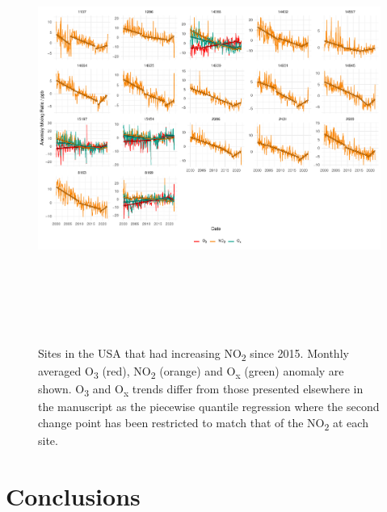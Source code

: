 \documentclass[journal abbreviation, manuscript]{copernicus}
\begin{document}
\begin{figure}
    \includegraphics[height=14cm]{figures/f14_no2_in_usa.pdf}
\caption{Sites in the USA that had increasing NO\textsubscript{2} since 2015. Monthly averaged O\textsubscript{3} (red), NO\textsubscript{2} (orange) and O\textsubscript{x} (green) anomaly are shown. O\textsubscript{3} and O\textsubscript{x} trends differ from those presented elsewhere in the manuscript as the piecewise quantile regression where the second change point has been restricted to match that of the NO\textsubscript{2} at each site.}
\label{fig:no2_in_usa}
\end{figure}

\section{Conclusions}  %
\end{document}
